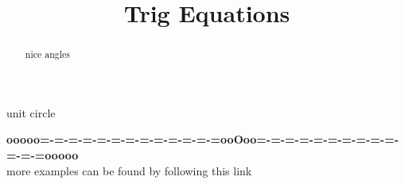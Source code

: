 \documentclass{ximera}
\title{Trig Equations}
\begin{document}
\begin{abstract}
nice angles
\end{abstract}
\maketitle




unit circle

















\begin{center}
\textbf{\textcolor{green!50!black}{ooooo=-=-=-=-=-=-=-=-=-=-=-=-=ooOoo=-=-=-=-=-=-=-=-=-=-=-=-=ooooo}} \\

more examples can be found by following this link\\ 

\end{center}
\end{document}
